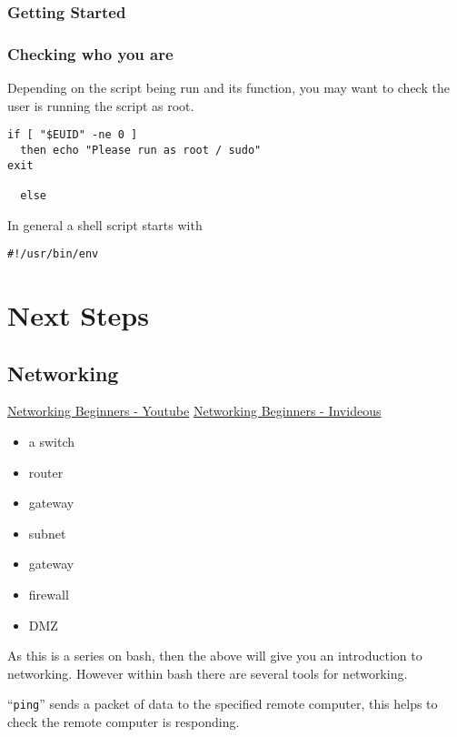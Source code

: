 \documentclass{extbook}
\begin{document}
\subsection{Getting Started}


\subsection{Checking who you are}

Depending on the script being run and its function, you may want to check the user is running the script as root.  

\begin{verbatim}
if [ "$EUID" -ne 0 ]
  then echo "Please run as root / sudo"
exit

  else
\end{verbatim}

In general a shell script starts with 

\begin{verbatim}
#!/usr/bin/env
\end{verbatim}

\chapter{Next Steps}

\section{Networking}

\href{https://www.youtube.com/watch?v=\_IOZ8\_cPgu8}{Networking Beginners - Youtube}
\href{https://invidious.snopyta.org/watch?v=\_IOZ8\_cPgu8}{Networking Beginners - Invideous}

\begin{itemize}
\item a switch
\item router
\item gateway
\item subnet
\item gateway
\item firewall
\item DMZ
\end{itemize}

As this is a series on bash,  then the above will give you an introduction to networking.  However within bash there are several tools for networking.

``\verb|ping|'' sends a packet of data to the specified remote computer, this helps to check the remote computer is responding.
\end{document}

